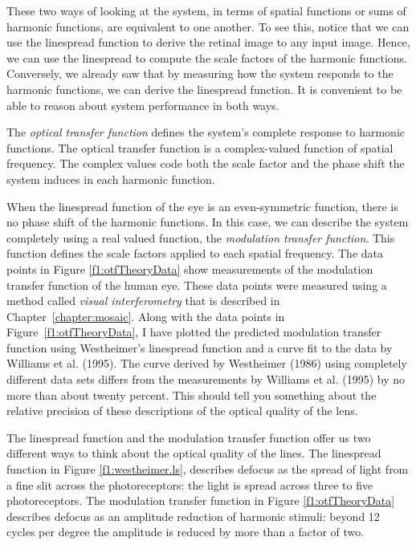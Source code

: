 These two ways of looking at the system,
in terms of spatial functions or sums of harmonic functions,
are equivalent to one another.
To see this,
notice that we can use the linespread function to derive the retinal
image to any input image.
Hence, we can use the
linespread to compute the scale factors of the harmonic functions.
Conversely, we already saw that by measuring how the system responds
to the harmonic functions, we can derive the linespread function.
It is convenient to be able to
reason about system performance in both ways.

The {\em optical transfer function} defines the system's
complete response to harmonic functions.
The optical transfer function is a complex-valued
function of spatial frequency.
The complex values code both the scale
factor and the phase shift the system
induces in each harmonic function.

When the linespread function of the eye is an even-symmetric
function, there is no phase shift of the harmonic functions.
In this case, we can describe the system
completely using a real valued function,
the {\em modulation transfer function}.
This function defines the scale factors applied to
each spatial frequency.
The data points in Figure \ref{f1:otfTheoryData}
show measurements of the modulation transfer function of the human eye.
These data points were measured using a method called
{\em visual interferometry} that is described in Chapter~\ref{chapter:mosaic}.
Along with the data points in Figure~\ref{f1:otfTheoryData},
I have plotted the predicted modulation transfer
function using Westheimer's
linespread function and a curve
fit to the data by Williams et al. (1995).
The curve derived by Westheimer (1986) using completely
different data sets differs from the measurements by Williams et al.
(1995) by no more than about twenty percent.
This should tell you something about the relative
precision of these descriptions of the optical quality of the lens.

The linespread function and the modulation transfer function
offer us two different ways to think about the optical quality
of the lines.
The linespread function in Figure \ref{f1:westheimer.ls},
describes defocus as the spread
of light from a fine slit across the photoreceptors:
the light is spread across three to five photoreceptors.
The modulation transfer function in Figure \ref{f1:otfTheoryData}
describes defocus
as an amplitude reduction of harmonic stimuli:
beyond 12 cycles per degree the amplitude
is reduced by more than a factor of two.
